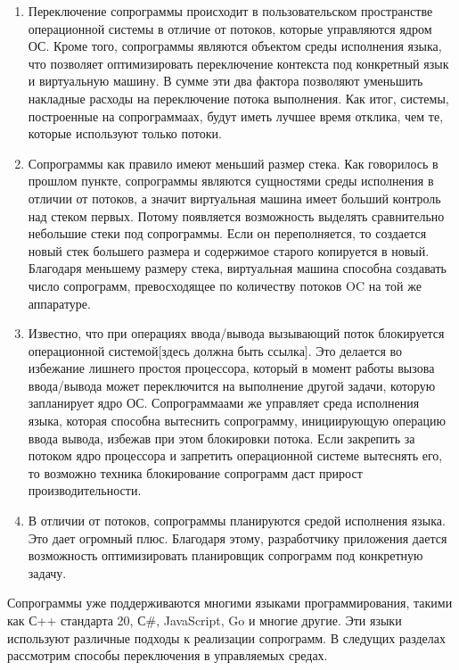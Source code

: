 	\begin{enumerate}
		\item Переключение сопрограммы происходит в пользовательском пространстве операционной системы в отличие от потоков, которые
		управляются ядром ОС. Кроме того, сопрограммы являются объектом среды исполнения языка, что позволяет оптимизировать переключение
		контекста под конкретный язык и виртуальную машину. В сумме эти два фактора позволяют уменьшить накладные расходы на переключение
		потока выполнения. Как итог, системы, построенные на сопрограммаах, будут иметь лучшее время отклика, чем те, которые используют
		только потоки.
		\item Сопрограммы как правило имеют меньший размер стека. Как говорилось в прошлом пункте,
		сопрограммы являются сущностями среды исполнения в отличии от потоков, а значит виртуальная машина имеет больший
		контроль над стеком первых. Потому появляется возможность выделять сравнительно небольшие стеки под сопрограммы. 
		Если он переполняется, то создается новый стек большего размера и содержимое старого копируется в новый. Благодаря меньшему
		размеру стека, виртуальная машина способна создавать число сопрограмм, превосходящее по количеству потоков OC на той же аппаратуре.
		\item Известно, что при операциях ввода/вывода вызывающий поток блокируется операционной системой[здесь должна быть ссылка]. Это
		делается во избежание лишнего простоя процессора, который в момент работы вызова ввода/вывода может
		переключится на выполнение другой задачи, которую запланирует ядро ОС. Сопрограммаами  же управляет среда
		исполнения языка, которая способна вытеснить сопрограмму, инициирующую операцию ввода вывода, избежав при
		этом блокировки потока. Если закрепить за потоком ядро процессора и запретить операционной системе вытеснять
		его, то возможно техника блокирование сопрограмм даст прирост производительности.
		\item В отличии от потоков, сопрограммы планируются средой исполнения языка. Это дает огромный плюс. 
		Благодаря этому, разработчику приложения дается возможность оптимизировать планировщик сопрограмм
		под конкретную задачу.
	\end{enumerate}
	
	Сопрограммы уже поддерживаются многими языками программирования, такими как С++ стандарта 20, С\#, JavaScript,
	Go и многие другие. Эти языки используют различные подходы к реализации сопрограмм. В следущих разделах 
	рассмотрим способы переключения в управляемых средах.
	
